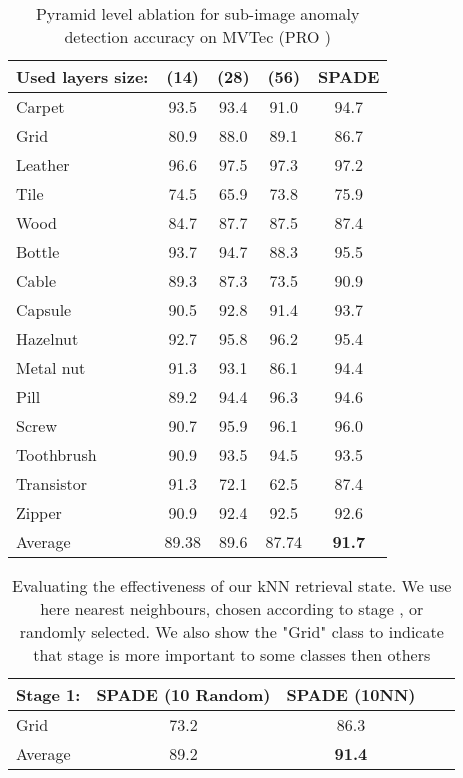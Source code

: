 \documentclass[runningheads]{llncs}
\begin{document}
\begin{table}[t]
  \centering
  \caption{Pyramid level ablation for sub-image anomaly detection accuracy on MVTec   (PRO )  }
  \label{tab:ablation:level}

    \begin{tabular}{lcccc}
    \toprule      

   Used layers size: & (14) & (28) & (56)  & SPADE \\
    \midrule
Carpet	&	93.5	&	93.4	&	91.0	&	94.7	\\
Grid	&	80.9	&	88.0	&	89.1	&	86.7	\\
Leather	&	96.6	&	97.5	&	97.3	&	97.2	\\
Tile	&	74.5	&	65.9	&	73.8	&	75.9	\\
Wood	&	84.7	&	87.7	&	87.5	&	87.4	\\
Bottle	&	93.7	&	94.7	&	88.3	&	95.5	\\
Cable	&	89.3	&	87.3	&	73.5	&	90.9	\\
Capsule	&	90.5	&	92.8	&	91.4	&	93.7	\\
Hazelnut	&	92.7	&	95.8	&	96.2	&	95.4	\\
Metal nut	&	91.3	&	93.1	&	86.1	&	94.4	\\
Pill	&	89.2	&	94.4	&	96.3	&	94.6	\\
Screw	&	90.7	&	95.9	&	96.1	&	96.0	\\
Toothbrush	&	90.9	&	93.5	&	94.5	&	93.5	\\
Transistor	&	91.3	&	72.1	&	62.5	&	87.4	\\
Zipper	&	90.9	&	92.4	&	92.5	&	92.6	\\
\midrule									
Average	&	89.38	&	89.6	&	87.74	&	\textbf{91.7}	\\

	 \bottomrule
    \end{tabular}
\end{table}

\begin{table}[t]
  \centering
  \caption{Evaluating the effectiveness of our kNN retrieval state. We use here  nearest neighbours, chosen according to stage , or randomly selected. We also show the "Grid" class to indicate that stage  is more important to some classes then others }
  \label{tab:K_ablation}

    \begin{tabular}{lcccc}
    \toprule      

   Stage 1: &  SPADE (10 Random)  & SPADE (10NN) \\
    \midrule
Grid		&	73.2	&	86.3	\\
\midrule											
Average 	&	89.2	&	\textbf{91.4}	\\

	 \bottomrule
    \end{tabular}
\end{table}
\end{document}
